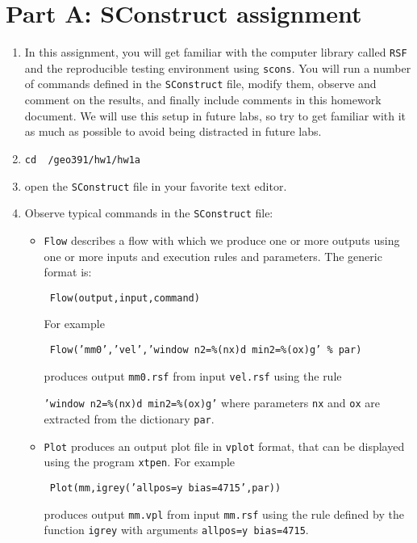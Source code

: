 \section{Part A: SConstruct assignment}

\begin{enumerate}

\item In this assignment, you will get familiar with 
the computer library called \texttt{RSF} and the reproducible testing
environment using \texttt{scons}.
You will run a number of commands defined in the 
\texttt{SConstruct} file, modify them, 
observe and comment on the results, and finally include comments
in this homework document.
We will use this setup in future labs, so try to get familiar with
it as much as possible to avoid being distracted in future labs.

\item \texttt{cd ~/geo391/hw1/hw1a}

\item open the \texttt{SConstruct} file in your favorite text editor.

\item Observe typical commands in the \texttt{SConstruct} file:
\begin{itemize}
\item \texttt{Flow} describes a flow with which we produce 
one or more outputs using one or more inputs and execution rules and
parameters. The generic format is:
\par
\texttt{ Flow(output,input,command) }
\par
For example
\par
\texttt{ Flow('mm0','vel','window n2=\%(nx)d min2=\%(ox)g' \% par)}
\par
produces output \texttt{mm0.rsf} from input \texttt{vel.rsf} using the rule
\par
\texttt{'window n2=\%(nx)d min2=\%(ox)g'} where parameters
\texttt{nx} and \texttt{ox} are extracted from the dictionary \texttt{par}.

\item \texttt{Plot} produces an output plot file 
in \texttt{vplot} format, that can be displayed using the program 
\texttt{xtpen}.
For example
\par
\texttt{ Plot(mm,igrey('allpos=y bias=4715',par))}
\par
produces output \texttt{mm.vpl} from input 
\texttt{mm.rsf} using the rule defined by the function 
\texttt{igrey} with arguments \texttt{allpos=y bias=4715}.


\end{itemize}
\end{enumerate}
